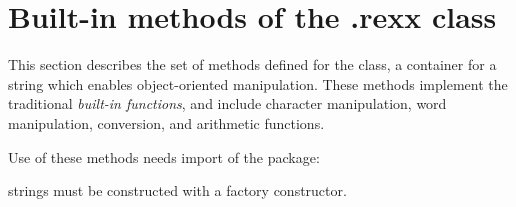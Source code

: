 \chapter{Built-in methods of the .rexx class}

This section describes the set of methods defined for the \rexx{} class,
a container for a \crexx{} string which enables object-oriented
manipulation. These methods implement the traditional \emph{built-in
functions}, and include character manipulation, word manipulation,
conversion, and arithmetic functions.
 
Use of these methods needs import of the  package:


\rexx{} strings must be constructed with a  factory constructor.

